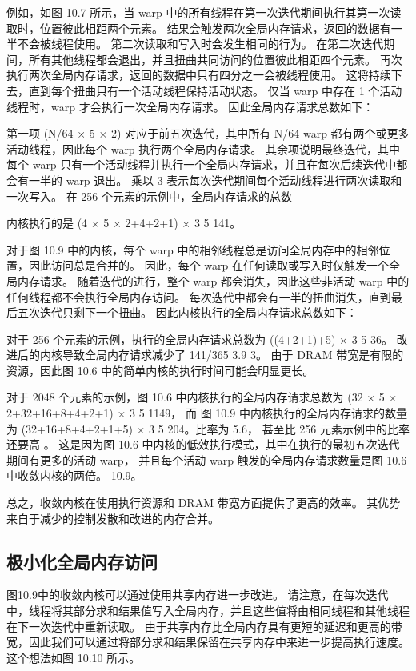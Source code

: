 例如，如图 10.7 所示，当 warp 中的所有线程在第一次迭代期间执行其第一次读取时，位置彼此相距两个元素。 
结果会触发两次全局内存请求，返回的数据有一半不会被线程使用。 第二次读取和写入时会发生相同的行为。 
在第二次迭代期间，所有其他线程都会退出，并且扭曲共同访问的位置彼此相距四个元素。 
再次执行两次全局内存请求，返回的数据中只有四分之一会被线程使用。 
这将持续下去，直到每个扭曲只有一个活动线程保持活动状态。 
仅当 warp 中存在 1 个活动线程时，warp 才会执行一次全局内存请求。 因此全局内存请求总数如下：

第一项 (N/64 × 5 × 2) 对应于前五次迭代，其中所有 N/64 warp 都有两个或更多活动线程，因此每个 warp 执行两个全局内存请求。 其余项说明最终迭代，其中每个 warp 只有一个活动线程并执行一个全局内存请求，并且在每次后续迭代中都会有一半的 warp 退出。 乘以 3 表示每次迭代期间每个活动线程进行两次读取和一次写入。 在 256 个元素的示例中，全局内存请求的总数

内核执行的是 (4 × 5 × 2+4+2+1) × 3 5 141。

对于图 10.9 中的内核，每个 warp 中的相邻线程总是访问全局内存中的相邻位置，因此访问总是合并的。 
因此，每个 warp 在任何读取或写入时仅触发一个全局内存请求。 
随着迭代的进行，整个 warp 都会消失，因此这些非活动 warp 中的任何线程都不会执行全局内存访问。 
每次迭代中都会有一半的扭曲消失，直到最后五次迭代只剩下一个扭曲。 因此内核执行的全局内存请求总数如下：

对于 256 个元素的示例，执行的全局内存请求总数为 ((4+2+1)+5) × 3 5 36。
改进后的内核导致全局内存请求减少了 141/365 3.9 3。 
由于 DRAM 带宽是有限的资源，因此图 10.6 中的简单内核的执行时间可能会明显更长。

对于 2048 个元素的示例，图 10.6 中内核执行的全局内存请求总数为 (32 × 5 × 2+32+16+8+4+2+1) × 3 5 1149，
而 图 10.9 中内核执行的全局内存请求的数量为 (32+16+8+4+2+1+5) × 3 5 204。比率为 5.6，
甚至比 256 元素示例中的比率还要高 。 
这是因为图 10.6 中内核的低效执行模式，其中在执行的最初五次迭代期间有更多的活动 warp，
并且每个活动 warp 触发的全局内存请求数量是图 10.6 中收敛内核的两倍。 10.9。

总之，收敛内核在使用执行资源和 DRAM 带宽方面提供了更高的效率。 其优势来自于减少的控制发散和改进的内存合并。

\subsection{极小化全局内存访问}
图10.9中的收敛内核可以通过使用共享内存进一步改进。 
请注意，在每次迭代中，线程将其部分求和结果值写入全局内存，并且这些值将由相同线程和其他线程在下一次迭代中重新读取。 
由于共享内存比全局内存具有更短的延迟和更高的带宽，因此我们可以通过将部分求和结果保留在共享内存中来进一步提高执行速度。 
这个想法如图 10.10 所示。

